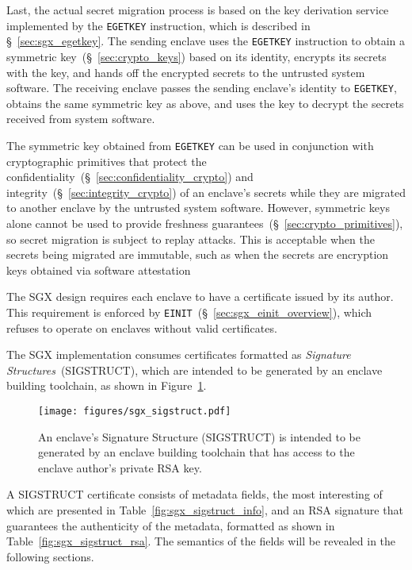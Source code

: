 Last, the actual secret migration process is based on the key derivation
service implemented by the \texttt{EGETKEY} instruction, which is described
in \S~\ref{sec:sgx_egetkey}. The sending enclave uses the \texttt{EGETKEY}
instruction to obtain a symmetric key~(\S~\ref{sec:crypto_keys}) based on its
identity, encrypts its secrets with the key, and hands off the encrypted
secrets to the untrusted system software. The receiving enclave passes the
sending enclave's identity to \texttt{EGETKEY}, obtains the same symmetric key
as above, and uses the key to decrypt the secrets received from system
software.

The symmetric key obtained from \texttt{EGETKEY} can be used in conjunction
with cryptographic primitives that protect the
confidentiality~(\S~\ref{sec:confidentiality_crypto}) and
integrity~(\S~\ref{sec:integrity_crypto}) of an enclave's secrets while they
are migrated to another enclave by the untrusted system software. However,
symmetric keys alone cannot be used to provide freshness
guarantees~(\S~\ref{sec:crypto_primitives}), so secret migration is subject to
replay attacks. This is acceptable when the secrets being migrated are
immutable, such as when the secrets are encryption keys obtained via software
attestation


\label{sec:sgx_sigstruct}
\label{sec:sgx_mrsigner}


The SGX design requires each enclave to have a certificate issued by its author.
This requirement is enforced by
\texttt{EINIT}~(\S~\ref{sec:sgx_einit_overview}), which refuses to operate on
enclaves without valid certificates.

The SGX implementation consumes certificates formatted as
\textit{Signature Structures}~(SIGSTRUCT), which are intended to be generated
by an enclave building toolchain, as shown in Figure~\ref{fig:sgx_sigstruct}.

\begin{figure}[hbt]
  \centering
  \texttt{[image: figures/sgx\_sigstruct.pdf]}
  \caption{
    An enclave's Signature Structure (SIGSTRUCT) is intended to be generated by
    an enclave building toolchain that has access to the enclave author's
    private RSA key.
  }
  \label{fig:sgx_sigstruct}
\end{figure}

A SIGSTRUCT certificate consists of metadata fields, the most interesting of
which are presented in Table~\ref{fig:sgx_sigstruct_info}, and an RSA
signature that guarantees the authenticity of the metadata, formatted as shown
in Table~\ref{fig:sgx_sigstruct_rsa}. The semantics of the fields will be
revealed in the following sections.

